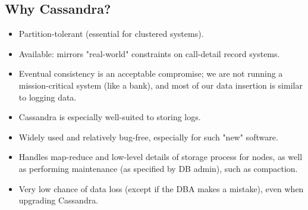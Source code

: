 \documentclass[letterpaper]{article}
\begin{document}
\subsection{Why Cassandra?}
\begin{itemize}
	\item Partition-tolerant (essential for clustered systems).
	\item Available: mirrors "real-world" constraints on call-detail record
		systems.
	\item Eventual consistency is an acceptable compromise; we are not
		running a mission-critical system (like a bank), and most of our
		data insertion is similar to logging data.
	\item Cassandra is especially well-suited to storing logs.
	\item Widely used and relatively bug-free, especially for such "new" 
		software.
	\item Handles map-reduce and low-level details of storage process for nodes,
		as well as performing maintenance (as specified by DB admin), such
		as compaction.
	\item Very low chance of data loss (except if the DBA makes a mistake),
		even when upgrading Cassandra.
\end{itemize}
\end{document}
